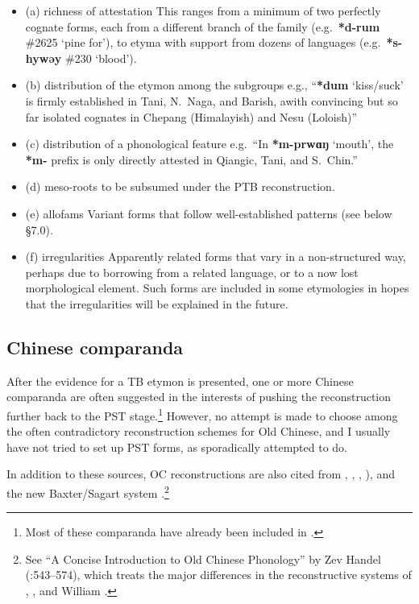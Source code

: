 \begin{itemize}
\item (a) richness of attestation
This ranges from a minimum of two perfectly cognate forms, each from a different branch of the family (e.g.\ \textbf{*d-rum} \#2625 ‘pine for’), to etyma with support from dozens of languages (e.g.\ \textbf{*s-hywǝy} \#230 ‘blood’).
\item (b) distribution of the etymon among the subgroups
e.g., “\textbf{*dum} ‘kiss/suck’ is firmly established in Tani, N.\ Naga, and Barish, awith convincing but so far isolated cognates in Chepang (Himalayish) and Nesu (Loloish)”
\item (c) distribution of a phonological feature
e.g.\ “In \textbf{*m-prwɑŋ} ‘mouth’, the \textbf{*m-} prefix is only directly attested in Qiangic, Tani, and S.\ Chin.”
\item (d) meso-roots to be subsumed under the PTB reconstruction.
\item (e) allofams 
Variant forms that follow well-established patterns (see below \S7.0).
\item (f) irregularities
Apparently related forms that vary in a non-structured way, perhaps due to borrowing from a related language, or to a now lost morphological element. Such forms are included in some etymologies in hopes that the irregularities will be explained in the future.
\end{itemize}

\subsection{Chinese comparanda}

After the evidence for a TB etymon is presented, one or more Chinese comparanda are often suggested in the interests of pushing the reconstruction further back to the PST stage.\footnote{Most of these comparanda have already been included in \textit{}.} However, no attempt is made to choose among the often contradictory reconstruction schemes for Old Chinese, and I usually have not tried to set up PST forms, as \textit{} sporadically attempted to do.

In addition to these sources, OC reconstructions are also cited from \citet{GHC-OCP,GHC-RCC}, \citet{WSC-SH}, \citet{PW-HLY}, \citet{AS-ABCOC,AS-MOC}), and the new Baxter/Sagart system \citet{WHBLS-2011}.\footnote{See “A Concise Introduction to Old Chinese Phonology” by Zev Handel (\textit{}:543–574), which treats the major differences in the reconstructive systems of \citet{GSR}, \citet{LI1976,LI1980}, and William \citet{WHB-OC}.}


